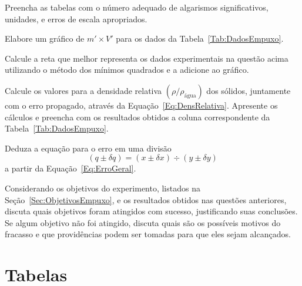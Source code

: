 \begin{question}[type={exam}]{1}
Preencha as tabelas com o número adequado de algarismos significativos, unidades, e erros de escala apropriados. 
\end{question}

\begin{question}[type={exam}]{1}
Elabore um gráfico de $m' \times V'$ para os dados da Tabela~\ref{Tab:DadosEmpuxo}.
\end{question}

\begin{question}[type={exam}]{1.5}
Calcule a reta que melhor representa os dados experimentais na questão acima utilizando o método dos mínimos quadrados e a adicione ao gráfico.
\end{question}

\begin{question}[type={exam}]{1.5}
Calcule os valores para a densidade relativa $(\rho/\rho_{\textrm{água}})$ dos sólidos, juntamente com o erro propagado, através da Equação~\ref{Eq:DensRelativa}. Apresente os cálculos e preencha com os resultados obtidos a coluna correspondente da Tabela~\ref{Tab:DadosEmpuxo}. 
\end{question}

\begin{question}[type={exam}]{1.5}
Deduza a equação para o erro em uma divisão
\begin{equation}
    (q \pm \delta q) = (x \pm \delta x) \div (y \pm \delta y)
\end{equation}
%
a partir da Equação~\eqref{Eq:ErroGeral}.
\end{question}

\begin{question}[type={exam}]{1.5}
Considerando os objetivos do experimento, listados na Seção~\ref{Sec:ObjetivosEmpuxo}, e os resultados obtidos nas questões anteriores, discuta quais objetivos foram atingidos com sucesso, justificando suas conclusões. Se algum objetivo não foi atingido, discuta quais são os possíveis motivos do fracasso e que providências podem ser tomadas para que eles sejam alcançados.
\end{question}

\vfill
\pagebreak
\section{Tabelas}

